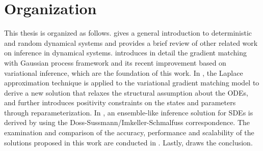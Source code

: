 \section{Organization}

This thesis is organized as follows.  gives a general introduction to deterministic and random dynamical systems and provides a brief review of other related work on inference in dynamical systems.
 introduces in detail the gradient matching with Gaussian process framework \citep{calderhead2009accelerating, dondelinger2013ode} and its recent improvement \citep{gorbach2016mean, gorbach2017scalable} based on variational inference, which are the foundation of this work.
In , the Laplace approximation technique is applied to the variational gradient matching model to derive a new solution that relaxes the structural assumption about the ODEs, and further introduces positivity constraints on the states and parameters through reparameterization.
In , an ensemble-like inference solution for SDEs is derived by using the Doss-Sussmann/Imkeller-Schmalfuss correspondence.
The examination and comparison of the accuracy, performance and scalability of the solutions proposed in this work are conducted in .
Lastly,  draws the conclusion.


